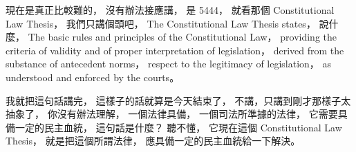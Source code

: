 \hypertarget{w02:cue:2586}{}現在是真正比較難的，
\hypertarget{w02:cue:2587}{}沒有辦法接應講，
\hypertarget{w02:cue:2588}{}是 5444，
\hypertarget{w02:cue:2589}{}就看那個 Constitutional Law Thesis，
\hypertarget{w02:cue:2590}{}我們只講個頭吧，
\hypertarget{w02:cue:2591}{}The Constitutional Law Thesis states，
\hypertarget{w02:cue:2592}{}說什麼，
\hypertarget{w02:cue:2593}{}The basic rules and principles of the Constitutional Law，
\hypertarget{w02:cue:2594}{}providing the criteria of validity and of proper interpretation of legislation，
\hypertarget{w02:cue:2595}{}derived from the substance of antecedent norms，
\hypertarget{w02:cue:2596}{}respect to the legitimacy of legislation，
\hypertarget{w02:cue:2597}{}as understood and enforced by the courts。

\hypertarget{w02:cue:2598}{}我就把這句話講完，
\hypertarget{w02:cue:2599}{}這樣子的話就算是今天結束了，
\hypertarget{w02:cue:2600}{}不講，只講到剛才那樣子太抽象了，
\hypertarget{w02:cue:2601}{}你沒有辦法理解，
\hypertarget{w02:cue:2602}{}一個法律具備，
\hypertarget{w02:cue:2603}{}一個司法所準據的法律，
\hypertarget{w02:cue:2604}{}它需要具備一定的民主血統，
\hypertarget{w02:cue:2605}{}這句話是什麼？
\hypertarget{w02:cue:2606}{}聽不懂，
\hypertarget{w02:cue:2607}{}它現在這個 Constitutional Law Thesis，
\hypertarget{w02:cue:2608}{}就是把這個所謂法律，
\hypertarget{w02:cue:2609}{}應具備一定的民主血統給一下解決。

